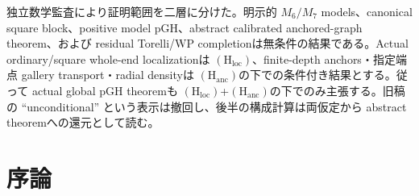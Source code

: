 \documentclass[11pt,a4paper]{ltjsarticle}
\newcommand{\cA}{\mathcal A}\newcommand{\cB}{\mathcal B}\newcommand{\cC}{\mathcal C}
\newcommand{\Hloc}{\ensuremath{(\mathrm H_{\mathrm{loc}})}}
\newcommand{\Hanc}{\ensuremath{(\mathrm H_{\mathrm{anc}})}}
\theoremstyle{plain}
\theoremstyle{definition}
\theoremstyle{remark}
\begin{document}
\begin{abstract}
Global pointed Gromov--Hausdorff convergenceについては、target distance functions の scalar calibration に基づく abstract gluing theoremを、単一の global selector mapではなく local skeletal maps の graph correspondenceとして無条件に証明する。Actual portal geometryに必要な finite-depth-preserving interior anchors、有限 chart-nerve connectors、prescribed-start/terminal lifts、有限 label remove/add transport、および radial densityは、独立の幾何学的入力 \Hanc として明示する。各 target transitionは
\[
 I_-\longrightarrow I_-\cap I_+\longrightarrow I_+
\]
という有限 label remove/add 手順で持ち上げる。\Hloc と \Hanc の双方を仮定すれば、portal-central modification、square model lift error、actual/model localization、unit/LSE errorを一つの式で追跡し、$M_6$ および generic $M_7(\lambda,\mu)$ に対して
\[
 (U_{\cA},R^{-1}d_{\omega_{\cA}},o)
 \xrightarrow[R\to\infty]{\mathrm{pGH}}
 (\mathfrak B_{\cA}^{\mathrm{KE}},0)
\]
を得る。したがって actual global pGH statementは本稿では条件付きである。これとは独立に、algebraic conifold models、canonical square metricと positive model pGH、abstract calibrated gluing theorem、および residual Torelli/Weil--Petersson resultsは無条件に保たれる。極限模型は nested-set subdivision と small-resolution presentation に依存せず、$M_7$ では $(\lambda,\mu)$ に依存しない。

最後に、$M_7$ の labelled realization space を $M_{0,5}$ と同定し、一つの node に隣接する二つの residual four-punctured curves だけで $(\lambda,\mu)$ を復元する single-node residual Torelli theorem を証明する。五つの residual Weil--Petersson forms の和による metric completion は $\ov M_{0,5}$ である。
\end{abstract}


\begin{statusbox}
独立数学監査により証明範囲を二層に分けた。明示的 $M_6/M_7$ models、canonical square block、positive model pGH、abstract calibrated anchored-graph theorem、および residual Torelli/WP completionは無条件の結果である。Actual ordinary/square whole-end localizationは \Hloc、finite-depth anchors・指定端点 gallery transport・radial densityは \Hanc の下での条件付き結果とする。従って actual global pGH theoremも \Hloc+\Hanc の下でのみ主張する。旧稿の ``unconditional'' という表示は撤回し、後半の構成計算は両仮定から abstract theoremへの還元として読む。
\end{statusbox}

\tableofcontents

\section{序論}
\end{document}
